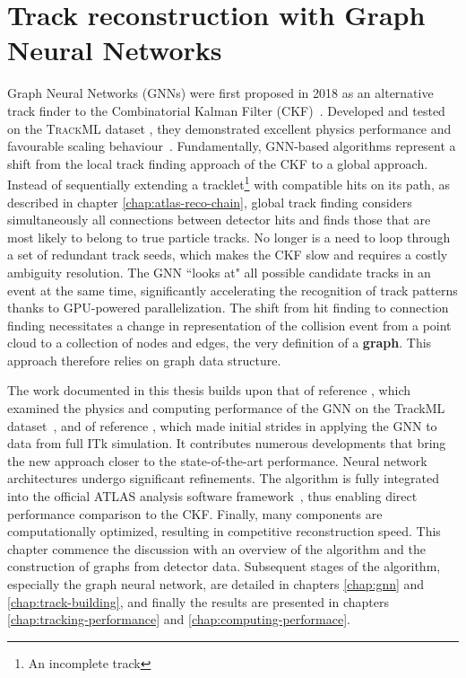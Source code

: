 \chapter{Track reconstruction with Graph Neural Networks}
\label{chap:graph-construction}


Graph Neural Networks (GNNs) were first proposed in 2018 as an alternative track finder to the Combinatorial Kalman Filter (CKF)~\cite{farrell2018noveldeeplearningmethods}.
Developed and tested on the \textsc{TrackML} dataset \cite{trackml-particle-identification}, they demonstrated excellent physics performance and favourable scaling behaviour~\cite{exatrkx, choma2020trackseedinglabellingembeddedspace}.
Fundamentally, GNN-based algorithms represent a shift from the local track finding approach of the CKF to a global approach.
Instead of sequentially extending a tracklet\footnote{An incomplete track} with compatible hits on its path, as described in chapter \ref{chap:atlas-reco-chain}, global track finding considers simultaneously all connections between detector hits and finds those that are most likely to belong to true particle tracks.
No longer is a need to loop through a set of redundant track seeds, which makes the CKF slow and requires a costly ambiguity resolution.
The GNN ``looks at" all possible candidate tracks in an event at the same time, significantly accelerating the recognition of track patterns thanks to GPU-powered parallelization.
The shift from hit finding to connection finding necessitates a change in representation of the collision event from a point cloud to a collection of nodes and edges, the very definition of a \textbf{graph}. 
This approach therefore relies on graph data structure.

The work documented in this thesis builds upon that of reference \cite{exatrkx}, which examined the physics and computing performance of the GNN on the TrackML dataset~\cite{trackml-particle-identification}, and of reference \cite{Caillou:ATL-ITK-PROC-2022-006}, which made initial strides in applying the GNN to data from full ITk simulation. 
It contributes numerous developments that bring the new approach closer to the state-of-the-art performance.
Neural network architectures undergo significant refinements.
The algorithm is fully integrated into the official ATLAS analysis software framework~\cite{atlas_collaboration_2021_4772550}, thus enabling direct performance comparison to the CKF.
Finally, many components are computationally optimized, resulting in competitive reconstruction speed.
This chapter commence the discussion with an overview of the algorithm and the construction of graphs from detector data. 
Subsequent stages of the algorithm, especially the graph neural network, are detailed in chapters \ref{chap:gnn} and \ref{chap:track-building}, and finally the results are presented in chapters \ref{chap:tracking-performance} and \ref{chap:computing-performace}.


